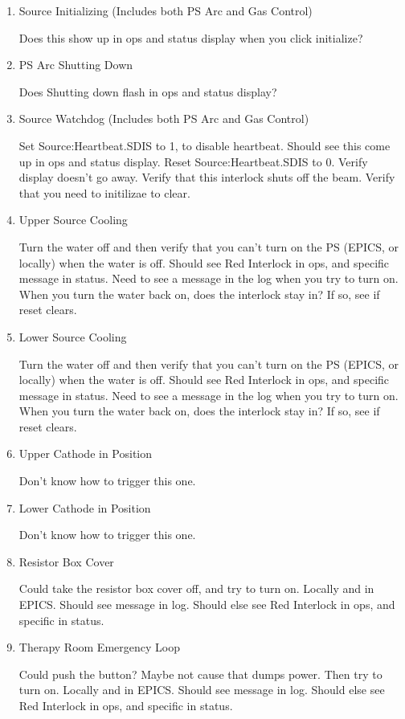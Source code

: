 \documentclass[11pt]{book}		%
\begin{document}
\begin{enumerate}
 \item Source Initializing (Includes both PS Arc and Gas Control)

\color{red}
Does this show up in ops and status display when you click initialize?
\color{black}

 \item PS Arc Shutting Down

\color{red}
Does Shutting down flash in ops and status display?
\color{black}

 \item Source Watchdog (Includes both PS Arc and Gas Control)

\color{red}
Set Source:Heartbeat.SDIS to 1, to disable heartbeat. Should see this come up in ops and status display. Reset Source:Heartbeat.SDIS to 0. Verify display doesn't go away. Verify that this interlock shuts off the beam. Verify that you need to initilizae to clear.
\color{black}

 \item Upper Source Cooling

\color{red}
Turn the water off and then verify that you can't turn on the PS (EPICS, or locally) when the water is off. Should see Red Interlock in ops, and specific message in status. Need to see a message in the log when you try to turn on. When you turn the water back on, does the interlock stay in? If so, see if reset clears.
\color{black}

 \item Lower Source Cooling

\color{red}
Turn the water off and then verify that you can't turn on the PS (EPICS, or locally) when the water is off. Should see Red Interlock in ops, and specific message in status. Need to see a message in the log when you try to turn on. When you turn the water back on, does the interlock stay in? If so, see if reset clears.
\color{black}

 \item Upper Cathode in Position

\color{red}
Don't know how to trigger this one.
\color{black}

 \item Lower Cathode in Position

\color{red}
Don't know how to trigger this one.
\color{black}

 \item Resistor Box Cover

\color{red}
Could take the resistor box cover off, and try to turn on. Locally and in EPICS. Should see message in log. Should else see Red Interlock in ops, and specific in status.
\color{black}

 \item Therapy Room Emergency Loop

\color{red}
Could push the button? Maybe not cause that dumps power. Then try to turn on. Locally and in EPICS. Should see message in log. Should else see Red Interlock in ops, and specific in status.
\color{black}

\end{enumerate}
\end{document}
